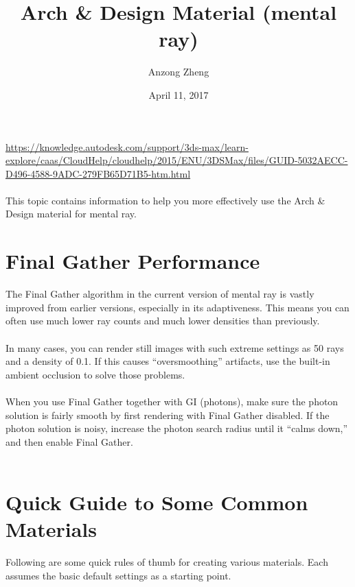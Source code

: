 \documentclass[10pt,a4paper]{article}
\begin{document}
\author{Anzong Zheng}
\title{Arch \& Design Material (mental ray)}
\date{April 11, 2017}
\maketitle

\tableofcontents

\newpage\clearpage\setcounter{page}{1}

\url{https://knowledge.autodesk.com/support/3ds-max/learn-explore/caas/CloudHelp/cloudhelp/2015/ENU/3DSMax/files/GUID-5032AECC-D496-4588-9ADC-279FB65D71B5-htm.html}
\\
\\
This topic contains information to help you more effectively use the Arch \& Design material for mental ray.

\section{Final Gather Performance}
The Final Gather algorithm in the current version of mental ray is vastly improved from earlier versions, especially in its adaptiveness. 
This means you can often use much lower ray counts and much lower densities than previously.
\\
\\
In many cases, you can render still images with such extreme settings as 50 rays and a density of 0.1. If this causes “oversmoothing” artifacts, use the built-in ambient occlusion to solve those problems.
\\
\\
When you use Final Gather together with GI (photons), make sure the photon solution is fairly smooth by first rendering with Final Gather disabled. If the photon solution is noisy, increase the photon search radius until it “calms down,” and then enable Final Gather.
\\
\\
\section{Quick Guide to Some Common Materials}
Following are some quick rules of thumb for creating various materials. Each assumes the basic default settings as a starting point.
\\
\\
\end{document}
